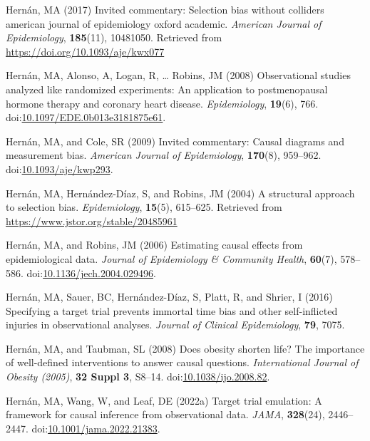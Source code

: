 \documentclass[
  singlecolumn,
  9pt]{article}
\begin{document}
\begin{CSLReferences}
Hernán, MA (2017) Invited commentary: Selection bias without colliders
\textbar{} american journal of epidemiology \textbar{} oxford academic.
\emph{American Journal of Epidemiology}, \textbf{185}(11), 10481050.
Retrieved from \url{https://doi.org/10.1093/aje/kwx077}

Hernán, MA, Alonso, A, Logan, R, \ldots{} Robins, JM (2008)
Observational studies analyzed like randomized experiments: An
application to postmenopausal hormone therapy and coronary heart
disease. \emph{Epidemiology}, \textbf{19}(6), 766.
doi:\href{https://doi.org/10.1097/EDE.0b013e3181875e61}{10.1097/EDE.0b013e3181875e61}.

Hernán, MA, and Cole, SR (2009) Invited commentary: Causal diagrams and
measurement bias. \emph{American Journal of Epidemiology},
\textbf{170}(8), 959--962.
doi:\href{https://doi.org/10.1093/aje/kwp293}{10.1093/aje/kwp293}.

Hernán, MA, Hernández-Díaz, S, and Robins, JM (2004) A structural
approach to selection bias. \emph{Epidemiology}, \textbf{15}(5),
615--625. Retrieved from \url{https://www.jstor.org/stable/20485961}

Hernán, MA, and Robins, JM (2006) Estimating causal effects from
epidemiological data. \emph{Journal of Epidemiology \& Community
Health}, \textbf{60}(7), 578--586.
doi:\href{https://doi.org/10.1136/jech.2004.029496}{10.1136/jech.2004.029496}.

Hernán, MA, Sauer, BC, Hernández-Díaz, S, Platt, R, and Shrier, I (2016)
Specifying a target trial prevents immortal time bias and other
self-inflicted injuries in observational analyses. \emph{Journal of
Clinical Epidemiology}, \textbf{79}, 7075.

Hernán, MA, and Taubman, SL (2008) Does obesity shorten life? The
importance of well-defined interventions to answer causal questions.
\emph{International Journal of Obesity (2005)}, \textbf{32 Suppl 3},
S8--14.
doi:\href{https://doi.org/10.1038/ijo.2008.82}{10.1038/ijo.2008.82}.

Hernán, MA, Wang, W, and Leaf, DE (2022a) Target trial emulation: A
framework for causal inference from observational data. \emph{JAMA},
\textbf{328}(24), 2446--2447.
doi:\href{https://doi.org/10.1001/jama.2022.21383}{10.1001/jama.2022.21383}.


\end{CSLReferences}
\end{document}
